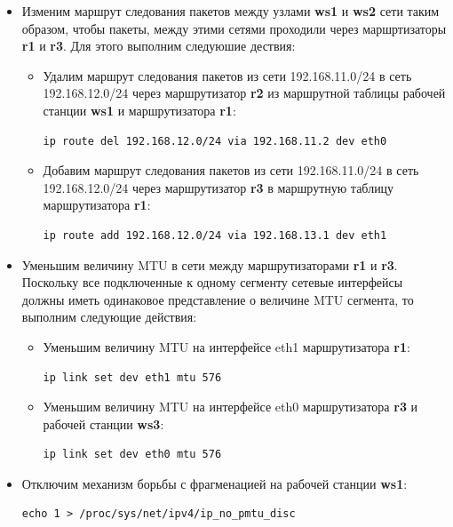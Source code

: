 \documentclass[a4paper,12pt]{article}
\begin{document}
\begin{itemize}

\item Изменим маршрут следования пакетов между узлами \textbf{ws1} и \textbf{ws2} сети 
       таким образом, чтобы пакеты, между этими сетями проходили через маршртизаторы 
       \textbf{r1} и \textbf{r3}. Для этого выполним следуюшие дествия:

\begin{itemize}

\item Удалим маршрут следования пакетов из сети 192.168.11.0/24 в сеть
       192.168.12.0/24 через маршрутизатор \textbf{r2} из маршрутной таблицы
       рабочей станции \textbf{ws1} и маршрутизатора \textbf{r1}:

\begin{Verbatim}
ip route del 192.168.12.0/24 via 192.168.11.2 dev eth0
\end{Verbatim}

\item Добавим маршрут следования пакетов из сети 192.168.11.0/24 в сеть
       192.168.12.0/24 через маршрутизатор \textbf{r3} в маршрутную таблицу
       маршрутизатора \textbf{r1}:

\begin{Verbatim}
ip route add 192.168.12.0/24 via 192.168.13.1 dev eth1
\end{Verbatim}

\end{itemize}

\item Уменьшим величину MTU в сети между маршрутизаторами \textbf{r1} и \textbf{r3}. 
       Поскольку все подключенные к одному сегменту сетевые интерфейсы должны иметь 
       одинаковое представление о величине MTU сегмента, то выполним следующие действия:
       
\begin{itemize}

\item Уменьшим величину MTU на интерфейсе eth1 маршрутизатора \textbf{r1}:

\begin{Verbatim}
ip link set dev eth1 mtu 576
\end{Verbatim}

\item Уменьшим величину MTU на интерфейсе eth0 маршрутизатора \textbf{r3} и рабочей 
         станции \textbf{ws3}:

\begin{Verbatim}
ip link set dev eth0 mtu 576
\end{Verbatim}

\end{itemize}

\item Отключим механизм борьбы с фрагменацией на рабочей станции \textbf{ws1}:

\begin{Verbatim}
echo 1 > /proc/sys/net/ipv4/ip_no_pmtu_disc
\end{Verbatim}

\end{itemize}
\end{document}
